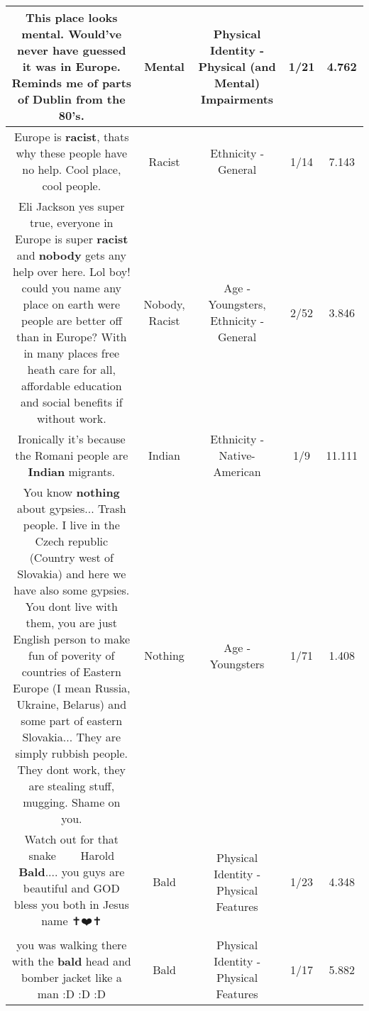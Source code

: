 \documentclass[11pt]{article}
\newlength\mylength
\begin{document}
\begin{center}
\begin{longtable}{|C{.65\mylength}|C{.30\mylength}|C{.12\mylength}|C{.12\mylength}|C{.12\mylength}|}
  \small This place looks \textbf{mental}. Would've never have guessed it was in Europe. Reminds me of parts of Dublin from the 80's.\normalsize   & Mental & Physical Identity - Physical (and Mental) Impairments & 1/21 & 4.762 \\  \hline
  \small Europe is \textbf{racist}, thats why these people have no help. Cool place, cool people.\normalsize   & Racist & Ethnicity - General & 1/14 & 7.143 \\  \hline
  \small Eli Jackson yes super true, everyone in Europe is super \textbf{racist} and \textbf{nobody} gets any help over here. Lol boy! could you name any place on earth were people are better off than in Europe? With in many places free heath care for all, affordable education and social benefits if without work.\normalsize   & Nobody, Racist & Age - Youngsters, Ethnicity - General & 2/52 & 3.846 \\  \hline
  \small Ironically it's because the Romani people are \textbf{Indian} migrants.\normalsize   & Indian & Ethnicity - Native-American & 1/9 & 11.111 \\  \hline
  \small You know \textbf{nothing} about gypsies... Trash people. I live in the Czech republic (Country west of Slovakia) and here we have also some gypsies. You dont live with them, you are just English person to make fun of poverity of countries of Eastern Europe (I mean Russia, Ukraine, Belarus) and some part of eastern Slovakia... They are simply rubbish people. They dont work, they are stealing stuff, mugging. Shame on you.\normalsize   & Nothing & Age - Youngsters & 1/71 & 1.408 \\  \hline
  \small Watch out for that snake 🐍 🐍 🐍 Harold \textbf{Bald}.... you guys are beautiful and GOD bless you both in Jesus name ✝️❤️✝️\normalsize   & Bald & Physical Identity - Physical Features & 1/23 & 4.348 \\  \hline
  \small you was walking there with the \textbf{bald} head and bomber jacket like a man :D :D :D\normalsize   & Bald & Physical Identity - Physical Features & 1/17 & 5.882 \\  \hline

\end{longtable}
\end{center}
\end{document}
